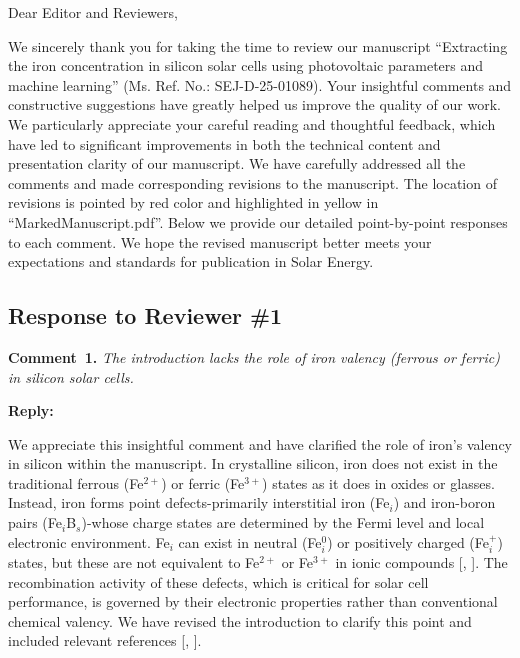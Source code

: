 \documentclass[a4paper,fleqn]{cas-sc}
\begin{document}
\shorttitle{}

Dear Editor and Reviewers,

We sincerely thank you for taking the time to review our manuscript 
``Extracting the iron concentration in silicon solar cells using photovoltaic parameters and machine learning'' 
(Ms. Ref. No.: SEJ-D-25-01089).
Your insightful comments and constructive suggestions have greatly helped us improve 
the quality of our work. 
We particularly appreciate your careful reading and thoughtful feedback, 
which have led to significant improvements in both the technical content and presentation clarity of our manuscript. 
We have carefully addressed all the comments and made corresponding revisions to the manuscript.
The location of revisions is pointed by red color and highlighted in yellow in ``MarkedManuscript.pdf''.
Below we provide our detailed point-by-point responses to each comment. 
We hope the revised manuscript better meets your expectations and standards for publication in Solar Energy.

\subsection*{Response to Reviewer \#1 }

\noindent
\textcolor[rgb]{0.00,0.50,1.00}{\textbf{Comment~1.}}
\emph{The introduction lacks the role of iron valency (ferrous or ferric) in silicon solar cells.}

\noindent
\textcolor[rgb]{0.51,0.00,0.00}{\textbf{Reply:}}

We appreciate this insightful comment and have clarified the role of iron’s valency in silicon within the manuscript.
In crystalline silicon, iron does not exist in the traditional ferrous (Fe$^{2+}$) or ferric (Fe$^{3+}$) states as it does in oxides or glasses.
Instead, iron forms point defects-primarily interstitial iron (Fe$_i$) and iron-boron pairs (Fe$_i$B$_s$)-whose charge states are determined by the Fermi level and local electronic environment.
Fe$_i$ can exist in neutral (Fe$_i^0$) or positively charged (Fe$_i^+$) states, but these are not equivalent to Fe$^{2+}$ or Fe$^{3+}$ in ionic compounds [\cite{macdonald2004}, \cite{istratov1999}].
The recombination activity of these defects, which is critical for solar cell performance, is governed by their electronic properties rather than conventional chemical valency.
We have revised the introduction to clarify this point and included relevant references [\cite{macdonald2004}, \cite{istratov1999}].
\end{document}
